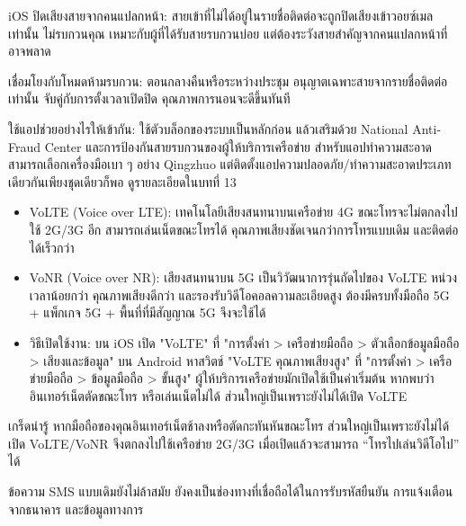 iOS ปิดเสียงสายจากคนแปลกหน้า: สายเข้าที่ไม่ได้อยู่ในรายชื่อติดต่อจะถูกปิดเสียงเข้าวอยซ์เมลเท่านั้น ไม่รบกวนคุณ เหมาะกับผู้ที่ได้รับสายรบกวนบ่อย แต่ต้องระวังสายสำคัญจากคนแปลกหน้าที่อาจพลาด

เชื่อมโยงกับโหมดห้ามรบกวน: ตอนกลางคืนหรือระหว่างประชุม อนุญาตเฉพาะสายจากรายชื่อติดต่อเท่านั้น จับคู่กับการตั้งเวลาเปิดปิด คุณภาพการนอนจะดีขึ้นทันที

ใช้แอปช่วยอย่างไรให้เข้ากัน: ใช้ตัวบล็อกของระบบเป็นหลักก่อน แล้วเสริมด้วย National Anti-Fraud Center และการป้องกันสายรบกวนของผู้ให้บริการเครือข่าย สำหรับแอปทำความสะอาดสามารถเลือกเครื่องมือเบา ๆ อย่าง Qingzhuo แต่ติดตั้งแอปความปลอดภัย/ทำความสะอาดประเภทเดียวกันเพียงชุดเดียวก็พอ ดูรายละเอียดในบทที่ 13


\begin{itemize}
  \item VoLTE (Voice over LTE): เทคโนโลยีเสียงสนทนาบนเครือข่าย 4G ขณะโทรจะไม่ตกลงไปใช้ 2G/3G อีก สามารถเล่นเน็ตขณะโทรได้ คุณภาพเสียงชัดเจนกว่าการโทรแบบเดิม และติดต่อได้เร็วกว่า
  \item VoNR (Voice over NR): เสียงสนทนาบน 5G เป็นวิวัฒนาการรุ่นถัดไปของ VoLTE หน่วงเวลาน้อยกว่า คุณภาพเสียงดีกว่า และรองรับวิดีโอคอลความละเอียดสูง ต้องมีครบทั้งมือถือ 5G + แพ็กเกจ 5G + พื้นที่ที่มีสัญญาณ 5G จึงจะใช้ได้
  \item วิธีเปิดใช้งาน: บน iOS เปิด "VoLTE" ที่ "การตั้งค่า > เครือข่ายมือถือ > ตัวเลือกข้อมูลมือถือ > เสียงและข้อมูล" บน Android หาสวิตช์ "VoLTE คุณภาพเสียงสูง" ที่ "การตั้งค่า > เครือข่ายมือถือ > ข้อมูลมือถือ > ขั้นสูง" ผู้ให้บริการเครือข่ายมักเปิดใช้เป็นค่าเริ่มต้น หากพบว่าอินเทอร์เน็ตตัดขณะโทร หรือเล่นเน็ตไม่ได้ ส่วนใหญ่เป็นเพราะยังไม่ได้เปิด VoLTE
\end{itemize}

\begin{tcbinfo}{เกร็ดน่ารู้}
หากมือถือของคุณอินเทอร์เน็ตช้าลงหรือตัดกะทันหันขณะโทร ส่วนใหญ่เป็นเพราะยังไม่ได้เปิด VoLTE/VoNR จึงตกลงไปใช้เครือข่าย 2G/3G เมื่อเปิดแล้วจะสามารถ “โทรไปเล่นวิดีโอไป” ได้

\end{tcbinfo}


ข้อความ SMS แบบเดิมยังไม่ล้าสมัย ยังคงเป็นช่องทางที่เชื่อถือได้ในการรับรหัสยืนยัน การแจ้งเตือนจากธนาคาร และข้อมูลทางการ

